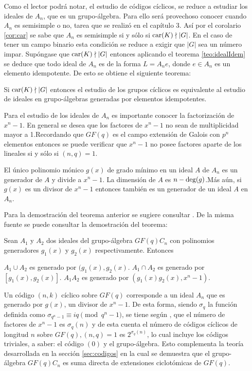 Como el lector podrá notar, el estudio de códigos cíclicos, se reduce a estudiar los ideales de $A_n$, que es un grupo-álgebra. Para ello será provechoso conocer cuando $A_n$ es semisimple o no, tarea que se realizó en el capítulo 3. 
Así por el corolario \ref{cor:car} se sabe que $A_n$ es semisimple si y sólo si $\operatorname{car}(K) \nmid |G|$. En el caso de tener un campo binario esta condición se reduce a exigir que $|G|$ sea un número impar. Supóngase que $\operatorname{car}(K) \nmid |G|$ entonces aplicando el teorema \ref{teo:idealIdem} se deduce que todo ideal de $A_n$ es de la forma $L=A_ne$, donde $e \in A_n$ es un elemento idempotente. De esto se obtiene el siguiente teorema:
\begin{teorema}
Si $\operatorname{car}(K)\nmid|G|$ entonces el estudio de los grupos cíclicos es equivalente al estudio de ideales en grupo-álgebras generadas por elementos idempotentes.
\end{teorema}
Para el estudio de los ideales de $A_n$ es importante conocer la factorización de $x^n-1$. En general se desea que los factores de $x^n-1$ no sean de multiplicidad mayor a 1.Recordando que $GF(q)$ es el campo extensión de Galois con $p^n$ elementos entonces se puede verificar que $x^n-1$ no posee factores aparte de los lineales si y sólo si $(n,q)=1$.
\begin{teorema}
El único polinomio mónico $g(x)$ de grado mínimo en un ideal $A$ de $A_n$ es un generador de $A$ y divide a $x^n-1$. La dimensión de $A$ es $n -\operatorname{deg}(g)$.Más aún, si $g(x)$ es un divisor de $x^n-1$ entonces también es un generador de un ideal $A$ en $A_n$.
\end{teorema}
Para la demostración del  teorema anterior se sugiere consultar \cite[p. 52]{bib:codeBook}. De la misma fuente se puede consultar la demostración del teorema:
\begin{teorema}
Sean $A_1$ y $A_2$ dos ideales del grupo-álgebra $GF(q)C_n$ con polinomios generadores $g_1(x)$ y $g_2(x)$ respectivamente. Entonces
\begin{bulletList}
\newItem $A_1 \cup A_2$ es generado por $(g_1(x),g_2(x)$.
\newItem $A_1 \cap A_2$ es generado por $[g_1(x),g_2(x)]$.
\newItem $A_1A_2$ es generado por $(g_1(x)g_2(x),x^n-1)$.
\end{bulletList}
\end{teorema}
Un código $(n,k)$ cíclico sobre $GF(q)$ corresponde a un ideal $A_n$ que es generado por $g(x)$, un divisor de $x^n-1$. De esta forma, siendo $\sigma_q$ la función definida como $\sigma_{q^n-1} \equiv iq \pmod{q^n-1}$, se tiene según \cite[p. 31]{bib:codeBook}, que el número de factores de $x^n-1$ es $\sigma_q(n)$ y de esta cuenta el número de códigos cíclicos de longitud $n$ sobre $GF(q), (n,q)=1$ es $2^{\sigma_q(n)}$, lo cual incluye los códigos triviales, a saber: el código $(0)$ y el grupo-álgebra. Esto complementa la teoría desarrollada en la sección \ref{sec:codigos} en la cual se demuestra que el grupo-álgebra $GF(q)C_n$ es suma directa de extensiones ciclotómicas de $GF(q)$.

